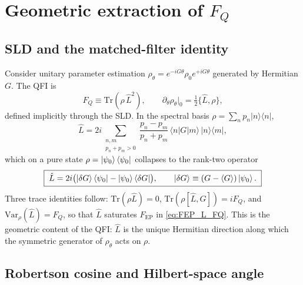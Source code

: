 \documentclass[11pt,a4paper]{article}
\newcommand{\FQ}{F_Q}
\newcommand{\FEP}{F_{\mathrm{EP}}}
\newcommand{\Var}{\mathrm{Var}}
\renewcommand{\Tr}{\mathrm{Tr}}
\newcommand{\SLD}{\hat{L}}
\newcommand{\PsiZ}{\ket{\psi_0}}
\newcommand{\BraZ}{\bra{\psi_0}}
\newcommand{\dG}{\ket{\delta G}}
\newcommand{\dGb}{\bra{\delta G}}
\providecommand{\anticomm}[2]{\{#1,#2\}}\renewcommand{\anticomm}[2]{\{#1,#2\}}
\begin{document}
\section{Geometric extraction of $\FQ$}
\label{sec:geom}

\subsection{SLD and the matched-filter identity}
\label{sec:sld}

Consider unitary parameter estimation
$\rho_\theta=e^{-iG\theta}\rho_0e^{+iG\theta}$ generated by
Hermitian $G$.  The QFI is
\begin{equation}
   \FQ\equiv\Tr(\rho\,\SLD^2),\qquad
   \partial_\theta\rho_\theta\big|_0=\tfrac12\anticomm{\SLD}{\rho},
   \label{eq:FQ_general}
\end{equation}
defined implicitly through the SLD.  In the spectral basis
$\rho=\sum_np_n|n\rangle\langle n|$,
\begin{equation}
   \SLD=2i\!\!\sum_{\substack{n,m\\p_n+p_m>0}}\!\!\frac{p_n-p_m}{p_n+p_m}\,
   \langle n|G|m\rangle\,|n\rangle\langle m|,
   \label{eq:SLD_spectral}
\end{equation}
which on a pure state $\rho=\PsiZ\BraZ$ collapses to the rank-two
operator
\begin{equation}
   \boxed{\;\SLD=2i\bigl(\dG\BraZ-\PsiZ\dGb\bigr),\qquad
   \dG\equiv(G-\langle G\rangle)\PsiZ.\;}
   \label{eq:SLD_pure}
\end{equation}
Three trace identities follow:
$\Tr(\rho\SLD)=0$, $\Tr(\rho[\SLD,G])=i\FQ$, and
$\Var_\rho(\SLD)=\FQ$, so that $\SLD$ saturates $\FEP$ in
\eqref{eq:FEP_L_FQ}.  This is the geometric content of the QFI:
$\SLD$ is the unique Hermitian direction along which the symmetric
generator of $\rho_\theta$ acts on $\rho$.

\subsection{Robertson cosine and Hilbert-space angle}
\label{sec:robertson}
\end{document}
